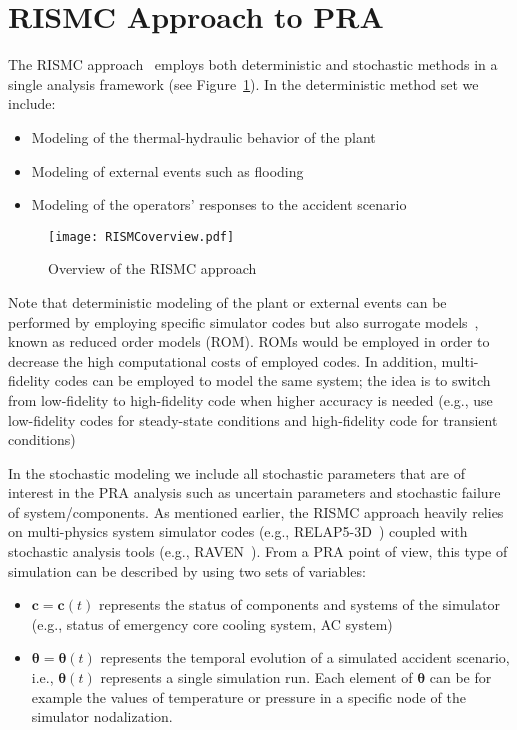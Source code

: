 \section{RISMC Approach to PRA}
\label{sec:rismc}
The RISMC approach~\cite{RISMC} employs both deterministic and stochastic methods 
in a single analysis framework (see Figure~\ref{fig:RISMCoverview}). In the deterministic method 
set we include:
\begin{itemize}
  \item Modeling of the thermal-hydraulic behavior of the plant~\cite{BWR_SBO_Mandelli,BWRanalysis}
  \item Modeling of external events such as flooding~\cite{mandelliPSA2015}
  \item Modeling of the operators’ responses to the accident scenario~\cite{HRA_BoringReport2014}
\end{itemize}

\begin{figure}
    \centering
    \centerline{\texttt{[image: RISMCoverview.pdf]}}
    \caption{Overview of the RISMC approach}
    \label{fig:RISMCoverview}
\end{figure}

Note that deterministic modeling of the plant or external events can be performed by employing specific 
simulator codes but also surrogate models~\cite{ROM}, known as reduced order models (ROM). ROMs would be employed 
in order to decrease the high computational costs of employed codes. In addition, multi-fidelity codes 
can be employed to model the same system; the idea is to switch from low-fidelity to high-fidelity code 
when higher accuracy is needed (e.g., use low-fidelity codes for steady-state conditions and high-fidelity 
code for transient conditions)

In the stochastic modeling we include all stochastic parameters that are of interest in the PRA analysis 
such as uncertain parameters and stochastic failure of system/components.
As mentioned earlier, the RISMC approach heavily relies on multi-physics system simulator codes 
(e.g., RELAP5-3D~\cite{relap5}) coupled with stochastic analysis tools (e.g., RAVEN~\cite{raven}).  
From a PRA point of view, this type of simulation can be described by using two sets of variables:
\begin{itemize}
  \item $\boldsymbol c = \boldsymbol c(t)$ represents the status of components and systems of the simulator 
        (e.g., status of emergency core cooling system, AC system)
  \item $\boldsymbol \theta = \boldsymbol \theta (t)$ represents the temporal evolution of a simulated 
        accident scenario, i.e., $\boldsymbol \theta (t)$ represents a single simulation run. 
        Each element of $\boldsymbol \theta$ can be for example the values of temperature or pressure in 
        a specific node of the simulator nodalization.
\end{itemize}

